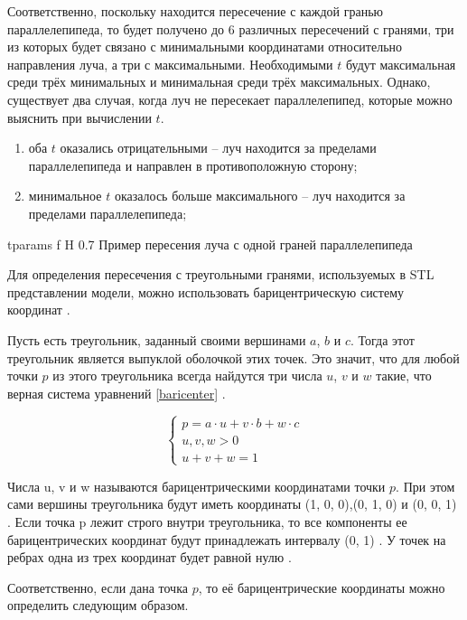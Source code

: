 Соответственно, поскольку находится пересечение с каждой гранью параллелепипеда, то будет получено до 6 различных пересечений с гранями, три из которых будет связано с минимальными координатами относительно направления луча, а три с максимальными.
Необходимыми $t$ будут максимальная среди трёх минимальных и минимальная среди трёх максимальных.
Однако, существует два случая, когда луч не пересекает параллелепипед, которые можно выяснить при вычислении $t$.

\begin{enumerate}
	\item оба $t$ оказались отрицательными -- луч находится за пределами параллелепипеда и направлен в противоположную сторону;
	\item минимальное $t$ оказалось больше максимального -- луч находится за пределами параллелепипеда;
\end{enumerate}

{tparams}
{f}
{H}
{0.7\textwidth}
{Пример пересения луча с одной граней параллелепипеда}

Для определения пересечения с треугольными гранями, используемых в STL представлении модели, можно использовать барицентрическую систему координат \cite{kdtree}.

Пусть есть треугольник, заданный своими вершинами $a$, $b$ и $c$. 
Тогда этот треугольник является выпуклой оболочкой этих точек. 
Это значит, что для любой точки $p$ из этого треугольника всегда найдутся три числа $u$, $v$ и $w$ такие, что верная система уравнений \ref{baricenter} \cite{kdtree}.

\begin{equation}
	\label{baricenter}
	\begin{cases}
		p = a \cdot u + v · b + w \cdot c \\
		u, v, w > 0 \\
		u + v + w = 1
	\end{cases}
\end{equation}

Числа u, v и w называются барицентрическими координатами точки $p$. 
При этом сами вершины треугольника будут иметь координаты (1, 0, 0),(0, 1, 0) и (0, 0, 1) \cite{kdtree}. 
Если точка p лежит строго внутри треугольника, то все компоненты ее барицентрических координат будут принадлежать интервалу (0, 1) \cite{kdtree}.
У точек на ребрах одна из трех координат будет равной нулю \cite{kdtree}.

Соответственно, если дана точка $p$, то её барицентрические координаты можно определить следующим образом.

